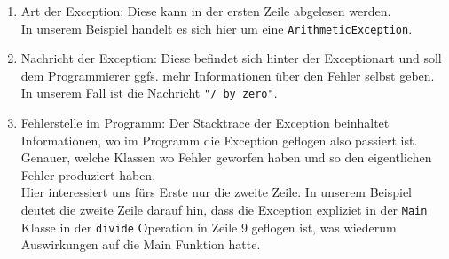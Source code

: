 \begin{Infobox}[Exception]
    \begin{enumerate}[label=\roman*)]
        \item Art der Exception: Diese kann in der ersten Zeile abgelesen werden.\\
            In unserem Beispiel handelt es sich hier um eine \lstinline{ArithmeticException}.
        \item Nachricht der Exception: Diese befindet sich hinter der Exceptionart und soll dem Programmierer ggfs. mehr Informationen über den Fehler selbst geben.\\
            In unserem Fall ist die Nachricht \lstinline{"/ by zero"}.
        \item Fehlerstelle im Programm: Der Stacktrace der Exception beinhaltet Informationen, wo im Programm die Exception geflogen also passiert ist. Genauer, welche Klassen wo Fehler geworfen haben und so den eigentlichen Fehler produziert haben.\\
            Hier interessiert uns fürs Erste nur die zweite Zeile. In unserem Beispiel deutet die zweite Zeile darauf hin, dass die Exception expliziet in der \lstinline{Main} Klasse in der \lstinline{divide}
        Operation in Zeile 9 geflogen ist, was wiederum Auswirkungen auf die Main Funktion hatte. 
    \end{enumerate}

\end{Infobox}


